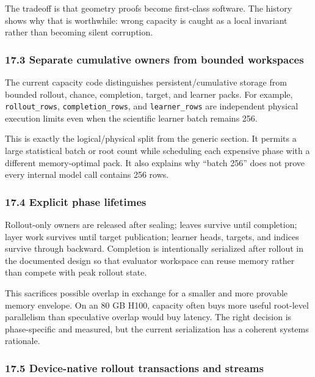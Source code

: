 \documentclass[
  10pt,
  letterpaper,
]{article}
\begin{document}
The tradeoff is that geometry proofs become first-class software. The
history shows why that is worthwhile: wrong capacity is caught as a
local invariant rather than becoming silent corruption.

\subsubsection{17.3 Separate cumulative owners from bounded
workspaces}\label{173-separate-cumulative-owners-from-bounded-workspaces}

The current capacity code distinguishes persistent/cumulative storage
from bounded rollout, chance, completion, target, and learner packs. For
example, \texttt{rollout\_rows}, \texttt{completion\_rows}, and
\texttt{learner\_rows} are independent physical execution limits even
when the scientific learner batch remains 256.

This is exactly the logical/physical split from the generic section. It
permits a large statistical batch or root count while scheduling each
expensive phase with a different memory-optimal pack. It also explains
why ``batch 256'' does not prove every internal model call contains 256
rows.

\subsubsection{17.4 Explicit phase
lifetimes}\label{174-explicit-phase-lifetimes}

Rollout-only owners are released after sealing; leaves survive until
completion; layer work survives until target publication; learner heads,
targets, and indices survive through backward. Completion is
intentionally serialized after rollout in the documented design so that
evaluator workspace can reuse memory rather than compete with peak
rollout state.

This sacrifices possible overlap in exchange for a smaller and more
provable memory envelope. On an 80 GB H100, capacity often buys more
useful root-level parallelism than speculative overlap would buy
latency. The right decision is phase-specific and measured, but the
current serialization has a coherent systems rationale.

\subsubsection{17.5 Device-native rollout transactions and
streams}\label{175-device-native-rollout-transactions-and-streams}
\end{document}
